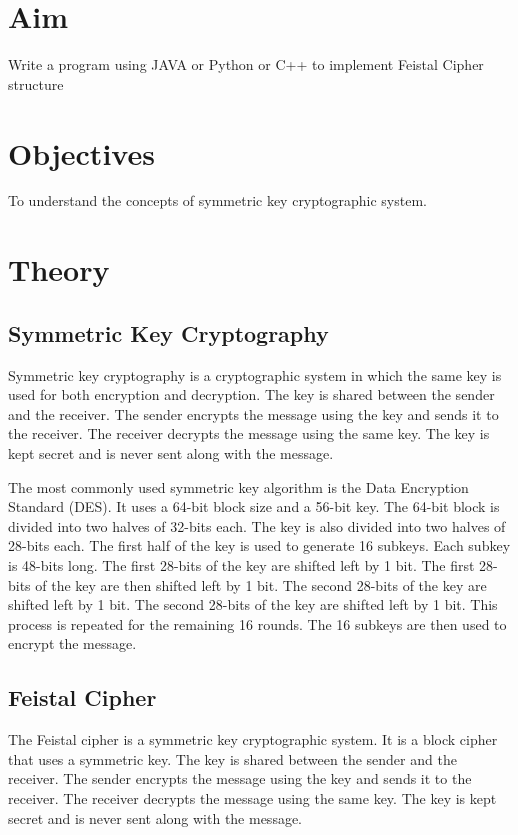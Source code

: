 \documentclass[11pt]{article}
\begin{document}
\tableofcontents
\thispagestyle{empty}
\clearpage

\setcounter{page}{1}

\section{Aim}
Write a program using JAVA or Python or C++ to implement Feistal Cipher structure

\section{Objectives}
To understand the concepts of symmetric key cryptographic system.

\section{Theory}
\subsection{Symmetric Key Cryptography}

Symmetric key cryptography is a cryptographic system in which the same key is used for both encryption and decryption. The key is shared between the sender and the receiver. The sender encrypts the message using the key and sends it to the receiver. The receiver decrypts the message using the same key. The key is kept secret and is never sent along with the message.

The most commonly used symmetric key algorithm is the Data Encryption Standard (DES). It uses a 64-bit block size and a 56-bit key. The 64-bit block is divided into two halves of 32-bits each. The key is also divided into two halves of 28-bits each. The first half of the key is used to generate 16 subkeys. Each subkey is 48-bits long. The first 28-bits of the key are shifted left by 1 bit. The first 28-bits of the key are then shifted left by 1 bit. The second 28-bits of the key are shifted left by 1 bit. The second 28-bits of the key are shifted left by 1 bit. This process is repeated for the remaining 16 rounds. The 16 subkeys are then used to encrypt the message.

\subsection{Feistal Cipher}

The Feistal cipher is a symmetric key cryptographic system. It is a block cipher that uses a symmetric key. The key is shared between the sender and the receiver. The sender encrypts the message using the key and sends it to the receiver. The receiver decrypts the message using the same key. The key is kept secret and is never sent along with the message.
\end{document}
